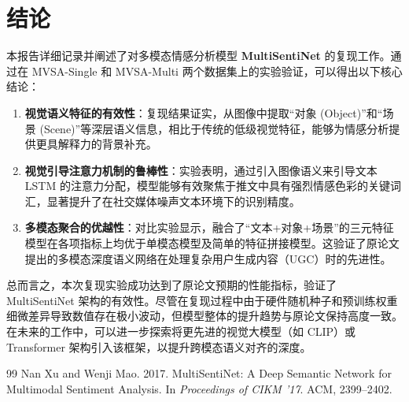 \documentclass[conference, 12pt,onecolumn]{IEEEtran}
\begin{document}
\section{结论}

本报告详细记录并阐述了对多模态情感分析模型 \textbf{MultiSentiNet} 的复现工作。通过在 MVSA-Single 和 MVSA-Multi 两个数据集上的实验验证，可以得出以下核心结论：

\begin{enumerate}
    \item \textbf{视觉语义特征的有效性}：复现结果证实，从图像中提取“对象 (Object)”和“场景 (Scene)”等深层语义信息，相比于传统的低级视觉特征，能够为情感分析提供更具解释力的背景补充。
    \item \textbf{视觉引导注意力机制的鲁棒性}：实验表明，通过引入图像语义来引导文本 LSTM 的注意力分配，模型能够有效聚焦于推文中具有强烈情感色彩的关键词汇，显著提升了在社交媒体噪声文本环境下的识别精度。
    \item \textbf{多模态聚合的优越性}：对比实验显示，融合了“文本+对象+场景”的三元特征模型在各项指标上均优于单模态模型及简单的特征拼接模型。这验证了原论文提出的多模态深度语义网络在处理复杂用户生成内容（UGC）时的先进性。
\end{enumerate}

总而言之，本次复现实验成功达到了原论文预期的性能指标，验证了 MultiSentiNet 架构的有效性。尽管在复现过程中由于硬件随机种子和预训练权重细微差异导致数值存在极小波动，但模型整体的提升趋势与原论文保持高度一致。在未来的工作中，可以进一步探索将更先进的视觉大模型（如 CLIP）或 Transformer 架构引入该框架，以提升跨模态语义对齐的深度。


\begin{thebibliography}{99}
 Nan Xu and Wenji Mao. 2017. MultiSentiNet: A Deep Semantic Network for Multimodal Sentiment Analysis. In \textit{Proceedings of CIKM '17}. ACM, 2399–2402.
\end{thebibliography}
\end{document}
